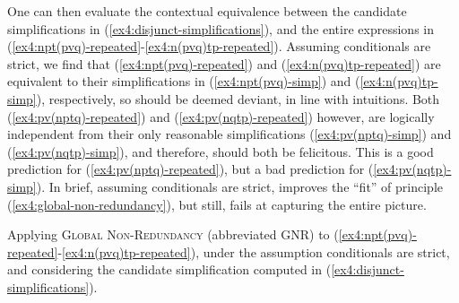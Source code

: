 One can then evaluate the contextual equivalence between the candidate simplifications in (\ref{ex4:disjunct-simplifications}), and the entire expressions in (\ref{ex4:npt(pvq)-repeated}-\ref{ex4:n(pvq)tp-repeated}). Assuming conditionals are strict, we find that (\ref{ex4:npt(pvq)-repeated}) and (\ref{ex4:n(pvq)tp-repeated}) are equivalent to their simplifications in (\ref{ex4:npt(pvq)-simp}) and (\ref{ex4:n(pvq)tp-simp}), respectively, so should be deemed deviant, in line with intuitions. Both (\ref{ex4:pv(nptq)-repeated}) and (\ref{ex4:pv(nqtp)-repeated}) however, are logically independent from their only reasonable simplifications (\ref{ex4:pv(nptq)-simp}) and (\ref{ex4:pv(nqtp)-simp}), and therefore, should both be felicitous. This is a good prediction for (\ref{ex4:pv(nptq)-repeated}), but a bad prediction for (\ref{ex4:pv(nqtp)-simp}). In brief, assuming conditionals are strict, improves the ``fit'' of principle (\ref{ex4:global-non-redundancy}), but still, fails at capturing the entire picture.

\begin{exe}
	\ex\label{ex4:gnr-strict} Applying \textsc{Global Non-Redundancy} (abbreviated GNR) to (\ref{ex4:npt(pvq)-repeated}-\ref{ex4:n(pvq)tp-repeated}), under the assumption conditionals are strict, and considering the candidate simplification computed in (\ref{ex4:disjunct-simplifications}). 
	\begin{xlist}
		\end{xlist}
\end{exe}

